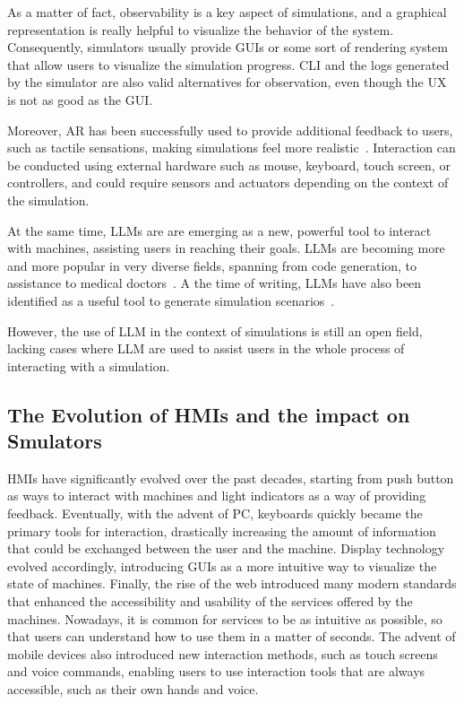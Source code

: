 \documentclass[conference]{IEEEtran}
\begin{document}
As a matter of fact,
observability is a key aspect of simulations,
and a graphical representation is really helpful to visualize the behavior of the system.
%
Consequently,
simulators usually provide \acp{GUI} or some sort of rendering system that allow users to visualize the simulation progress.
%
\ac{CLI} and the logs generated by the simulator are also valid alternatives for observation,
even though the \ac{UX} is not as good as the \ac{GUI}.

Moreover,
\ac{AR} has been successfully used to provide additional feedback to users,
such as tactile sensations,
making simulations feel more realistic~\cite{Jud2020}.
%
Interaction can be conducted using external hardware such as mouse, keyboard, touch screen, or controllers,
and could require sensors and actuators depending on the context of the simulation.

At the same time,
\ac{LLM}s are are emerging as a new, powerful tool to interact with machines,
assisting users in reaching their goals.
%
\acp{LLM} are becoming more and more popular in very diverse fields,
spanning from code generation,
to assistance to medical doctors~\cite{Wu2024}.
%
A the time of writing,
\acp{LLM} have also been identified as a useful tool to generate simulation scenarios~\cite{Zhang2023}.

However,
the use of \ac{LLM} in the context of simulations is still an open field,
lacking cases where \ac{LLM} are used to assist users in the whole process of interacting with a simulation.

\subsection{The Evolution of \acp{HMI} and the impact on Smulators}

\acp{HMI} have significantly evolved over the past decades,
starting from push button as ways to interact with machines and light indicators as a way of providing feedback.
%
Eventually,
with the advent of \ac{PC},
keyboards quickly became the primary tools for interaction,
drastically increasing the amount of information that could be exchanged between the user and the machine.
%
Display technology evolved accordingly,
introducing \acp{GUI} as a more intuitive way to visualize the state of machines.
%
Finally,
the rise of the web introduced many modern standards that enhanced the accessibility and usability of the services offered by the machines.
%
Nowadays,
it is common for services to be as intuitive as possible,
so that users can understand how to use them in a matter of seconds.
%
The advent of mobile devices also introduced new interaction methods,
such as touch screens and voice commands,
enabling users to use interaction tools that are always accessible,
such as their own hands and voice.
%
\end{document}
